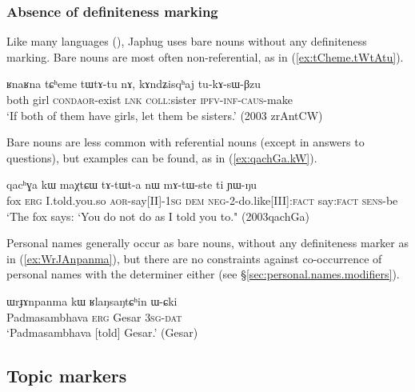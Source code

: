 \subsubsection{Absence of definiteness marking} \label{sec:non.overt.definite}
Like many languages (\citealt[130]{creissels06sgit1}), Japhug uses bare nouns without any definiteness marking. Bare nouns are most often non-referential, as  in (\ref{ex:tCheme.tWtAtu}).

\begin{exe}
\ex \label{ex:tCheme.tWtAtu}
\gll ʁnaʁna tɕʰeme tɯ\redp{}tɤ-tu nɤ, kɤndʑisqʰaj tu-kɤ-sɯ-βzu \\
both girl \textsc{cond}\redp{}\textsc{aor}-exist \textsc{lnk} \textsc{coll}:sister \textsc{ipfv}-\textsc{inf}-\textsc{caus}-make \\
\glt `If both of them have girls, let them be sisters.' (2003 zrAntCW)
\end{exe}

Bare nouns are less common with referential nouns (except in answers to questions), but examples can be found, as  in (\ref{ex:qachGa.kW}).

\begin{exe}
\ex \label{ex:qachGa.kW}
\gll qacʰɣa 	kɯ maχtɕɯ tɤ-tɯt-a nɯ mɤ-tɯ-ste ti ɲɯ-ŋu \\
fox \textsc{erg} I.told.you.so \textsc{aor}-say[II]-\textsc{1sg} \textsc{dem} \textsc{neg}-2-do.like[III]:\textsc{fact} say:\textsc{fact} \textsc{sens}-be \\
\glt `The fox says: `You do not do as I told you to." (2003qachGa)
\end{exe}

Personal names generally occur as bare nouns, without any definiteness marker as in (\ref{ex:WrJAnpanma}), but there are no constraints against co-occurrence of personal names with the determiner  either (see §\ref{sec:personal.names.modifiers}).

\begin{exe}
\ex \label{ex:WrJAnpanma}
\gll  ɯrɟɤnpanma kɯ ʁlaŋsaŋtɕʰin ɯ-ɕki  \\
 Padmasambhava \textsc{erg} Gesar \textsc{3sg}-\textsc{dat} \\
\glt `Padmasambhava [told] Gesar.' (Gesar)
\end{exe}

 \subsection{Topic markers} \label{sec:topic}
 
